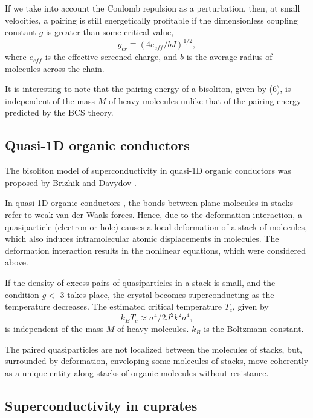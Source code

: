 If we take into account the Coulomb repulsion as a perturbation, then, at
small velocities, a pairing is still energetically profitable if the 
dimensionless coupling constant $g$ is greater than some critical value,
\begin{equation}
g_{cr} \equiv (4e_{eff}/bJ)^{1/2},
\end{equation}
where $e_{eff}$ is the effective screened charge, and $b$ is the average 
radius of molecules across the chain.

It is interesting to note that the pairing energy of a bisoliton, given by (6),
is independent of the mass $M$ of heavy molecules unlike that of the pairing
energy predicted by the BCS theory.

\subsection{Quasi-1D organic conductors}

The bisoliton model of superconductivity in quasi-1D organic conductors 
was proposed by Brizhik and Davydov \cite{bisoliton}. 

In quasi-1D organic conductors \cite{Jerome},  the bonds between plane 
molecules in stacks refer to weak van der Waals forces. Hence, due to the 
deformation interaction, a quasiparticle (electron or hole) causes a 
local deformation of a stack of molecules, which also induces
intramolecular atomic displacements in molecules. The deformation 
interaction results in the nonlinear equations, which were considered 
above.

If the density of excess pairs of quasiparticles in a stack is small, and the
condition $g <$ 3 takes place, the crystal becomes superconducting as the 
temperature decreases. The estimated critical temperature $T_{c}$, given by
\begin{equation}
k_{B}T_{c} \approx \sigma^{4}/2J^{2}k^{2}a^{4},
\end{equation}
is independent of the mass $M$ of heavy molecules. $k_{B}$ is the 
Boltzmann constant.

The paired quasiparticles are not localized between the molecules of 
stacks, but, surrounded by deformation, enveloping some molecules of 
stacks, move coherently as a unique entity along stacks of organic 
molecules without resistance. 

\subsection{Superconductivity in cuprates}

